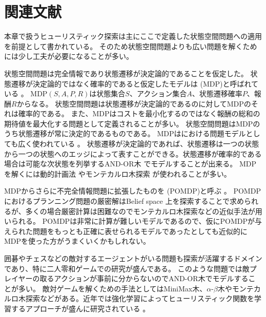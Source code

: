 \section{関連文献}

本章で扱うヒューリスティック探索は主にここで定義した状態空間問題への適用を前提として書かれている。
そのため状態空間問題よりも広い問題を解くためには少し工夫が必要になることが多い。

状態空間問題は完全情報であり状態遷移が決定論的であることを仮定した。
状態遷移が決定論的ではなく確率的であると仮定したモデルは (MDP)と呼ばれている \cite{puterman2014markov}。
MDP$(S, A, P, R)$は状態集合$S$、アクション集合$A$、状態遷移確率$P$、報酬$R$からなる。
状態空間問題は状態遷移が決定論的であるのに対してMDPのそれは確率的である。
また、MDPはコストを最小化するのではなく報酬の総和の期待値を最大化する問題として定義されることが多い。
状態空間問題はMDPのうち状態遷移が常に決定的であるものである。
MDPはにおける問題モデルとしても広く使われている \cite{sutton:99}。
状態遷移が決定論的であれば、状態遷移は一つの状態から一つの状態へのエッジによって表すことができる。状態遷移が確率的である場合は可能な次状態を列挙するAND-OR木 \cite{luger1997artificial}でモデルすることが出来る。
MDPを解くには動的計画法 \cite{puterman2014markov,barto1995learning}やモンテカルロ木探索 \cite{browne2012survey,kocsis2006bandit}が使われることが多い。

MDPからさらに不完全情報問題に拡張したものを (POMDP)と呼ぶ \cite{kaelbling1998planning}。
POMDPにおけるプランニング問題の厳密解はBelief space \cite{kaelbling1998planning}上を探索することで求められるが、多くの場合厳密計算は困難なのでモンテカルロ木探索などの近似手法が用いられる。
POMDPは非常に計算が難しいモデルであるので、仮にPOMDPが与えられた問題をもっとも正確に表せられるモデルであったとしても近似的にMDPを使った方がうまくいくかもしれない。

囲碁やチェスなどの敵対するエージェントがいる問題も探索が活躍するドメインであり、特に二人零和ゲームでの研究が盛んである。
このような問題では敵プレイヤーの取るアクションが事前に分からないのでAND-OR木でモデルすることが多い。
敵対ゲームを解くための手法としてはMiniMax木、$\alpha$-$\beta$木\cite{pearl84}やモンテカルロ木探索などがある。近年では強化学習によってヒューリスティック関数を学習するアプローチが盛んに研究されている \cite{sutton:99}。

